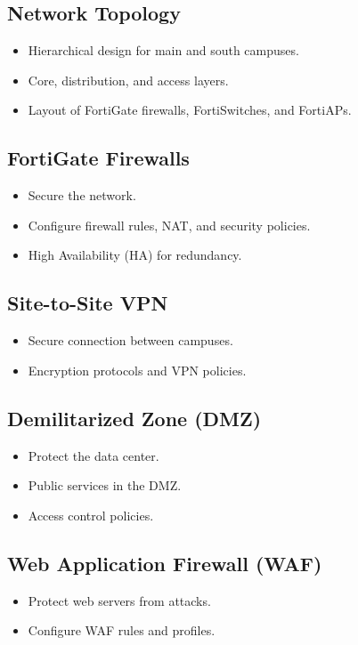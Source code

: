 \documentclass[12pt]{report}
\begin{document}
\subsection{Network Topology}
\begin{itemize}
    \item Hierarchical design for main and south campuses.
    \item Core, distribution, and access layers.
    \item Layout of FortiGate firewalls, FortiSwitches, and FortiAPs.
\end{itemize}

\subsection{FortiGate Firewalls}
\begin{itemize}
    \item Secure the network.
    \item Configure firewall rules, NAT, and security policies.
    \item High Availability (HA) for redundancy.
\end{itemize}

\subsection{Site-to-Site VPN}
\begin{itemize}
    \item Secure connection between campuses.
    \item Encryption protocols and VPN policies.
\end{itemize}

\subsection{Demilitarized Zone (DMZ)}
\begin{itemize}
    \item Protect the data center.
    \item Public services in the DMZ.
    \item Access control policies.
\end{itemize}

\subsection{Web Application Firewall (WAF)}
\begin{itemize}
    \item Protect web servers from attacks.
    \item Configure WAF rules and profiles.
\end{itemize}
\end{document}
